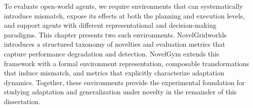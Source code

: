 To evaluate open-world agents, we require environments that can systematically introduce mismatch, expose its effects at both the planning and execution levels, and support agents with different representational and decision-making paradigms. This chapter presents two such environments. NovelGridworlds introduces a structured taxonomy of novelties and evaluation metrics that capture performance degradation and detection. NovelGym extends this framework with a formal environment representation, composable transformations that induce mismatch, and metrics that explicitly characterize adaptation dynamics. Together, these environments provide the experimental foundation for studying adaptation and generalization under novelty in the remainder of this dissertation.